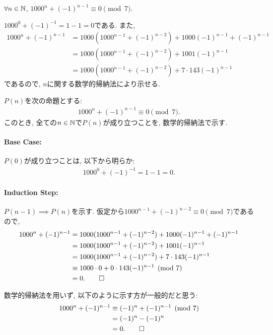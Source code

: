 \begin{prop}
  \label{p:20230802}
  $\forall n\in \mathbb{N}$,
  $1000^n+(-1)^{n-1}\equiv 0\pmod{7}$.
\end{prop}

\begin{proof**}
  $1000^0+(-1)^{-1}=1-1=0$である.
  また,
  \begin{align*}
    1000^n+(-1)^{n-1}
    &=1000(1000^{n-1}+(-1)^{n-2})+1000(-1)^{n-1}+(-1)^{n-1}\\
    &=1000(1000^{n-1}+(-1)^{n-2})+1001(-1)^{n-1}\\
    &=1000(1000^{n-1}+(-1)^{n-2})+7\cdot 143(-1)^{n-1}
  \end{align*}
  であるので,
  $n$に関する数学的帰納法により示せる.
\end{proof**}

\begin{proof*}
  $P(n)$を次の命題とする:
  \begin{align*}
    1000^n+(-1)^{n-1}\equiv 0\pmod{7}
    .
  \end{align*}
  このとき,
  全ての$n\in\mathbb{N}$で$P(n)$が成り立つことを,
  数学的帰納法で示す.

  \paragraph{Base Case:}
  $P(0)$が成り立つことは, 以下から明らか:
  \begin{align*}
    1000^0+(-1)^{-1}=1-1=0.
  \end{align*}

  \paragraph{Induction Step:}
  $P(n-1)\implies P(n)$を示す.
  仮定から$1000^{n-1}+(-1)^{n-2}\equiv 0\pmod{7}$であるので,
  \begin{align*}
    1000^n+(-1)^{n-1}
    &=1000(1000^{n-1}+(-1)^{n-2})+1000(-1)^{n-1}+(-1)^{n-1}\\
    &=1000(1000^{n-1}+(-1)^{n-2})+1001(-1)^{n-1}\\
    &=1000(1000^{n-1}+(-1)^{n-2})+7\cdot 143(-1)^{n-1}\\
    &\equiv 1000\cdot 0+0\cdot 143(-1)^{n-1}\pmod{7}\\
    &=0
    .\qedhere
  \end{align*}
\end{proof*}

\begin{rem}
  数学的帰納法を用いず, 以下のように示す方が一般的だと思う:
  \begin{align*}
    1000^n+(-1)^{n-1}&\equiv (-1)^n+(-1)^{n-1}\pmod{7}\\
    &=(-1)^n-(-1)^n\\
    &=0
    .\qedhere
  \end{align*}
\end{rem}

